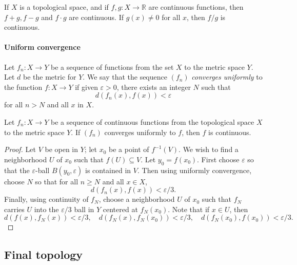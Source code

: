 \begin{theorem}
  If \( X \) is a topological space, and if \( f, g: X \to \mathbb{R} \) are continuous functions, then \( f + g, f - g \) and \( f \cdot g \) are continuous.
  If \( g(x) \neq 0 \) for all \( x \), then \( f / g \) is continuous.
\end{theorem}

\paragraph{Uniform convergence}

\begin{definition}
  Let \( f_n: X \to Y \) be a sequence of functions from the set \( X \) to the metric space \( Y \).
  Let \( d \) be the metric for \( Y \).
  We say that the sequence \( (f_n) \) \emph{converges uniformly} to the function \( f: X \to Y \) if given \( \varepsilon > 0 \), there exists an integer \( N \) such that
  \[
    d(f_n(x), f(x)) < \varepsilon
  \]
  for all \( n > N \) and all \( x \) in \( X \).
\end{definition}

\begin{theorem}
  Let \( f_n: X \to Y \) be a sequence of continuous functions from the topological space \( X \) to the metric space \( Y \).
  If \( (f_n) \) converges uniformly to \( f \), then \( f \) is continuous.
\end{theorem}
\begin{proof}
  Let \( V \) be open in \( Y \); let \( x_0 \) be a point of \( f^{-1}(V) \).
  We wish to find a neighborhood \( U \) of \( x_0 \) such that \( f(U) \subseteq V \).
  Let \( y_0 = f(x_0) \).
  First choose \( \varepsilon \) so that the \( \varepsilon \)-ball \( B(y_0, \varepsilon) \) is contained in \( V \).
  Then using uniformly convergence, choose \( N \) so that for all \( n \geq N \) and all \( x \in X \),
  \[
    d(f_n(x), f(x))  < \varepsilon / 3.
  \]
  Finally, using continuity of \( f_N \), choose a neighborhood \( U \) of \( x_0 \) such that \( f_N \) carries \( U \) into the \( \varepsilon / 3 \) ball in \( Y \) centered at \( f_N(x_0) \).
  Note that if \( x \in U \), then
  \[
    d(f(x), f_N(x)) < \varepsilon / 3, \quad d(f_N(x), f_N(x_0)) < \varepsilon / 3, \quad d(f_N(x_0), f(x_0)) < \varepsilon /3.
  \]
\end{proof}

\subsection{Final topology}

